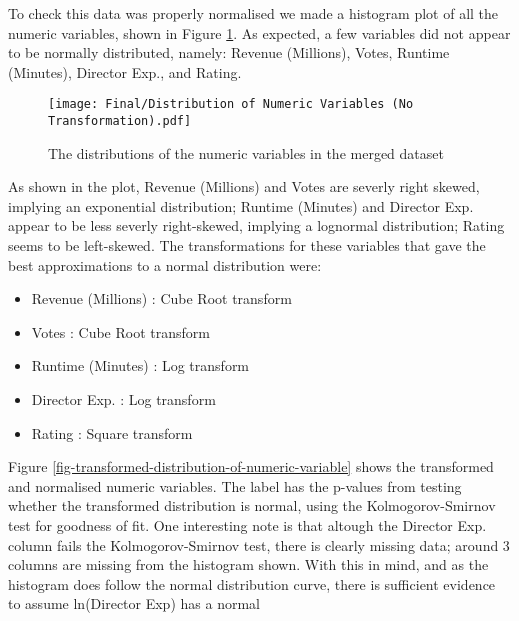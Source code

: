         To check this data was properly normalised we made a histogram plot of all the
            numeric variables, shown in Figure \ref*{fig-distribution-of-numeric-variable}.
        As expected, a few variables did not appear to be normally distributed, namely:
        Revenue (Millions), Votes, Runtime (Minutes), Director Exp., and Rating.
        \begin{figure}[H]
            \centering
            \texttt{[image: Final/Distribution of Numeric Variables (No Transformation).pdf]}
            \caption[short]{The distributions of the numeric variables in the merged dataset}\label{fig-distribution-of-numeric-variable}
        \end{figure}
        As shown in the plot, Revenue (Millions) and Votes are severly right skewed,
            implying an exponential distribution; Runtime (Minutes) and Director Exp.
        appear to be less severly right-skewed, implying a lognormal distribution;
        Rating seems to be left-skewed.
        The transformations for these variables that gave the best approximations to a
            normal distribution were:
        \begin{multicols}{2}
            \begin{itemize}
                \item Revenue (Millions) : Cube Root transform
                \item Votes              : Cube Root transform
                \item Runtime (Minutes)  : Log transform
                \item Director Exp.      : Log transform
                \item Rating             : Square transform
            \end{itemize}
        \end{multicols}
        Figure \ref*{fig-transformed-distribution-of-numeric-variable} shows the
            transformed and normalised numeric variables.
        The label has the p-values from testing whether the transformed distribution is
            normal, using the Kolmogorov-Smirnov test\cite*{KStest} for goodness of fit.
        One interesting note is that altough the Director Exp.
        column fails the Kolmogorov-Smirnov test, there is clearly missing
        data; around 3 columns are missing from the histogram shown.
        With this in mind, and as the histogram does follow the normal distribution
            curve, there is sufficient evidence to assume ln(Director Exp) has a normal
